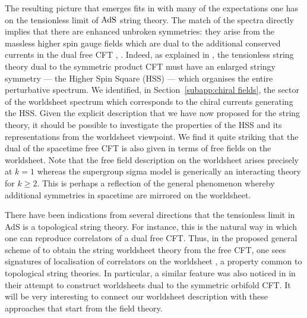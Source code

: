\documentclass[12pt,a4paper]{article}
\begin{document}
The resulting picture that emerges fits in with many of the expectations one has on the tensionless limit of ${\rm AdS}$ string theory. The match of the spectra directly implies that there are enhanced unbroken symmetries: they arise from the massless higher spin gauge fields which are dual to the additional conserved currents in the dual free CFT \cite{Gross:1988ue, Sundborg:2000wp, Witten, Mikhailov:2002bp}, \cite{Gaberdiel:2014cha}. Indeed, as explained in  \cite{Gaberdiel:2015mra, Gaberdiel:2015wpo}, the tensionless string theory dual to the symmetric product CFT must have an enlarged stringy symmetry --- the Higher Spin Square (HSS) --- which organises the entire perturbative spectrum. 
We identified, in Section~\ref{subapp:chiral fields},  the sector of the worldsheet spectrum which corresponds to the chiral currents generating the HSS. Given the explicit description that we have now proposed for the string theory, it should be possible to investigate the properties of the HSS and its representations from the worldsheet viewpoint. We find it quite striking that the dual of the spacetime free CFT is also given in terms of free fields on the worldsheet. Note that the free field description on the worldsheet arises precisely at $k=1$ whereas the supergroup sigma model is generically an interacting theory for $k\geq 2$. This is perhaps a reflection of the general phenomenon whereby additional symmetries in spacetime are mirrored on the worldsheet. 

There have been indications from several directions that the tensionless limit in AdS is a topological string theory. For instance, this is the natural way in which one can reproduce correlators of a dual free CFT.  Thus, in the proposed general scheme of \cite{Gopakumar:2003ns, Gopakumar:2004qb, Gopakumar:2005fx} to obtain the string worldsheet theory from the free CFT, one sees signatures of localisation of correlators on the worldsheet \cite{Aharony:2007fs, Razamat:2008zr, Gopakumar:2011ev, Gopakumar:2012ny}, a property common to topological string theories. In particular, a similar feature was also noticed in \cite{Pakman:2009zz} in their attempt to construct worldsheets dual to the symmetric orbifold CFT. It will be very interesting to connect our worldsheet description with these approaches that start from the field theory.     
\end{document}
